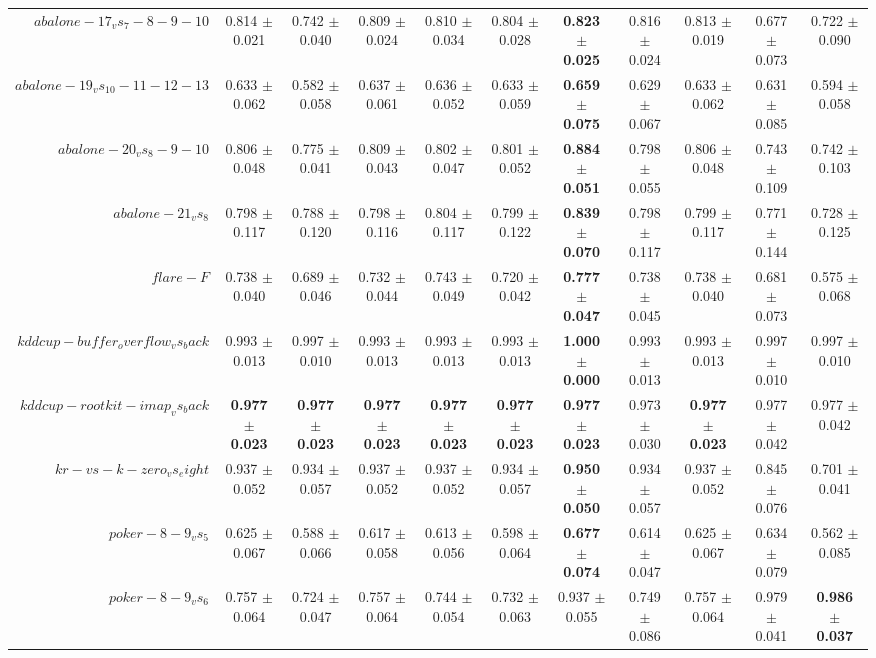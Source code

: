 \begin{table}[!ht]
{\begin{tabular}{r c c c c c c c c c c}
$abalone-17_vs_7-8-9-10$ & 0.814 $\pm$ 0.021 & 0.742 $\pm$ 0.040 & 0.809 $\pm$ 0.024 & 0.810 $\pm$ 0.034 & 0.804 $\pm$ 0.028 & \textbf{0.823 $\pm$ 0.025} & 0.816 $\pm$ 0.024 & 0.813 $\pm$ 0.019 & 0.677 $\pm$ 0.073 & 0.722 $\pm$ 0.090 \\
$abalone-19_vs_10-11-12-13$ & 0.633 $\pm$ 0.062 & 0.582 $\pm$ 0.058 & 0.637 $\pm$ 0.061 & 0.636 $\pm$ 0.052 & 0.633 $\pm$ 0.059 & \textbf{0.659 $\pm$ 0.075} & 0.629 $\pm$ 0.067 & 0.633 $\pm$ 0.062 & 0.631 $\pm$ 0.085 & 0.594 $\pm$ 0.058 \\
$abalone-20_vs_8-9-10$ & 0.806 $\pm$ 0.048 & 0.775 $\pm$ 0.041 & 0.809 $\pm$ 0.043 & 0.802 $\pm$ 0.047 & 0.801 $\pm$ 0.052 & \textbf{0.884 $\pm$ 0.051} & 0.798 $\pm$ 0.055 & 0.806 $\pm$ 0.048 & 0.743 $\pm$ 0.109 & 0.742 $\pm$ 0.103 \\
$abalone-21_vs_8$ & 0.798 $\pm$ 0.117 & 0.788 $\pm$ 0.120 & 0.798 $\pm$ 0.116 & 0.804 $\pm$ 0.117 & 0.799 $\pm$ 0.122 & \textbf{0.839 $\pm$ 0.070} & 0.798 $\pm$ 0.117 & 0.799 $\pm$ 0.117 & 0.771 $\pm$ 0.144 & 0.728 $\pm$ 0.125 \\
$flare-F$ & 0.738 $\pm$ 0.040 & 0.689 $\pm$ 0.046 & 0.732 $\pm$ 0.044 & 0.743 $\pm$ 0.049 & 0.720 $\pm$ 0.042 & \textbf{0.777 $\pm$ 0.047} & 0.738 $\pm$ 0.045 & 0.738 $\pm$ 0.040 & 0.681 $\pm$ 0.073 & 0.575 $\pm$ 0.068 \\
$kddcup-buffer_overflow_vs_back$ & 0.993 $\pm$ 0.013 & 0.997 $\pm$ 0.010 & 0.993 $\pm$ 0.013 & 0.993 $\pm$ 0.013 & 0.993 $\pm$ 0.013 & \textbf{1.000 $\pm$ 0.000} & 0.993 $\pm$ 0.013 & 0.993 $\pm$ 0.013 & 0.997 $\pm$ 0.010 & 0.997 $\pm$ 0.010 \\
$kddcup-rootkit-imap_vs_back$ & \textbf{0.977 $\pm$ 0.023} & \textbf{0.977 $\pm$ 0.023} & \textbf{0.977 $\pm$ 0.023} & \textbf{0.977 $\pm$ 0.023} & \textbf{0.977 $\pm$ 0.023} & \textbf{0.977 $\pm$ 0.023} & 0.973 $\pm$ 0.030 & \textbf{0.977 $\pm$ 0.023} & 0.977 $\pm$ 0.042 & 0.977 $\pm$ 0.042 \\
$kr-vs-k-zero_vs_eight$ & 0.937 $\pm$ 0.052 & 0.934 $\pm$ 0.057 & 0.937 $\pm$ 0.052 & 0.937 $\pm$ 0.052 & 0.934 $\pm$ 0.057 & \textbf{0.950 $\pm$ 0.050} & 0.934 $\pm$ 0.057 & 0.937 $\pm$ 0.052 & 0.845 $\pm$ 0.076 & 0.701 $\pm$ 0.041 \\
$poker-8-9_vs_5$ & 0.625 $\pm$ 0.067 & 0.588 $\pm$ 0.066 & 0.617 $\pm$ 0.058 & 0.613 $\pm$ 0.056 & 0.598 $\pm$ 0.064 & \textbf{0.677 $\pm$ 0.074} & 0.614 $\pm$ 0.047 & 0.625 $\pm$ 0.067 & 0.634 $\pm$ 0.079 & 0.562 $\pm$ 0.085 \\
$poker-8-9_vs_6$ & 0.757 $\pm$ 0.064 & 0.724 $\pm$ 0.047 & 0.757 $\pm$ 0.064 & 0.744 $\pm$ 0.054 & 0.732 $\pm$ 0.063 & 0.937 $\pm$ 0.055 & 0.749 $\pm$ 0.086 & 0.757 $\pm$ 0.064 & 0.979 $\pm$ 0.041 & \textbf{0.986 $\pm$ 0.037} \\

\end{tabular}}
\end{table}
